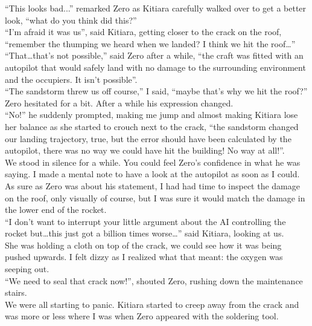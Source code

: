 \documentclass[a4paper,onecolumn,11pt]{article}
\begin{document}
\newline
``This looks bad...'' remarked Zero as Kitiara carefully walked over to get a better look, ``what do you think did this?''\\
``I'm afraid it was us'', said Kitiara, getting closer to the crack on the roof, ``remember the thumping we heard when we landed? I think we hit the roof\ldots''\\
\newline
``That\ldots that's not possible,'' said Zero after  a while, ``the craft was fitted with an autopilot that would safely land with no damage to the surrounding environment and the occupiers. It isn't possible''.\\
``The sandstorm threw us off course,'' I said, ``maybe that's why we hit the roof?''\\
\newline
Zero hesitated for a bit. After a while his expression changed.\\
\newline
``No!'' he suddenly prompted, making me jump and almost making Kitiara lose her balance as she started to crouch next to the crack, ``the sandstorm changed our landing trajectory, true, but the error should have been calculated by the autopilot, there was no way we could have hit the building! No way at all!''.\\
\newline
We stood in silence for a while. You could feel Zero's confidence in what he was saying. I made a mental note to have a look at the autopilot as soon as I could. As sure as Zero was about his statement, I had had time to inspect the damage on the roof, only visually of course, but I was sure it would match the damage in the lower end of the rocket.\\
\newline
``I don't want to interrupt your little argument about the AI controlling the rocket but\ldots this just got a billion times worse\ldots'' said Kitiara, looking at us.\\
\newline
She was holding a cloth on top of the crack, we could see how it was being pushed upwards. I felt dizzy as I realized what that meant: the oxygen was seeping out.\\
\newline
``We need to seal that crack now!'', shouted Zero, rushing down the maintenance stairs.\\
\newline
We were all starting to panic. Kitiara started to creep away from the crack and was more or less where I was when Zero appeared with the soldering tool.\\
\end{document}
